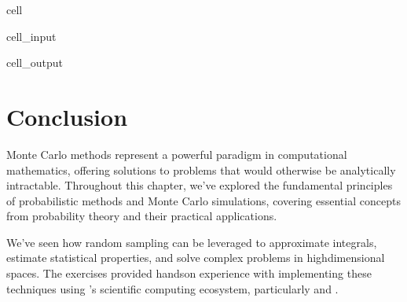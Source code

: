 \documentclass[letterpaper,10pt,english]{jupyterBook}
\begin{document}
\begin{sphinxuseclass}{cell}
\begin{sphinxVerbatimInput}
\begin{sphinxuseclass}{cell_input}
\begin{sphinxVerbatim}[commandchars=\\\{\}]
   
\end{sphinxVerbatim}

\end{sphinxuseclass}\end{sphinxVerbatimInput}
\begin{sphinxVerbatimOutput}

\begin{sphinxuseclass}{cell_output}
\noindent{}

\end{sphinxuseclass}\end{sphinxVerbatimOutput}

\end{sphinxuseclass}

\section{Conclusion}
\label{\detokenize{01:conclusion}}
\sphinxAtStartPar
Monte Carlo methods represent a powerful paradigm in computational mathematics, offering solutions to problems that would otherwise be analytically intractable. Throughout this chapter, we’ve explored the fundamental principles of probabilistic methods and Monte Carlo simulations, covering essential concepts from probability theory and their practical applications.

\sphinxAtStartPar
We’ve seen how random sampling can be leveraged to approximate integrals, estimate statistical properties, and solve complex problems in high\sphinxhyphen{}dimensional spaces. The exercises provided hands\sphinxhyphen{}on experience with implementing these techniques using ’s scientific computing ecosystem, particularly  and .
\end{document}
